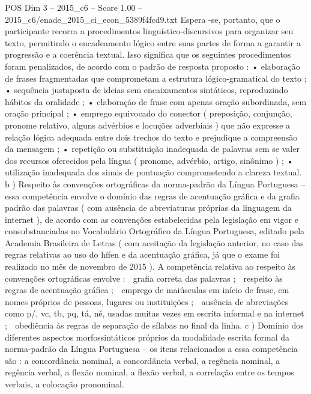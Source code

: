 \begin{textsample}{POS Dim 3 – 2015\_c6 – Score 1.00 – 2015\_c6/enade\_2015\_ci\_econ\_5389f4fcd9.txt}
Espera -se, portanto, que o participante recorra a procedimentos linguístico-discursivos para organizar seu texto, permitindo o encadeamento lógico entre suas partes de forma a garantir a progressão e a coerência textual.
Isso significa que os seguintes procedimentos foram penalizados, de acordo com o padrão de resposta proposto : • elaboração de frases fragmentadas que comprometam a estrutura lógico-gramatical do texto ; • sequência justaposta de ideias sem encaixamentos sintáticos, reproduzindo hábitos da oralidade ; • elaboração de frase com apenas oração subordinada, sem oração principal ; • emprego equivocado do conector ( preposição, conjunção, pronome relativo, alguns advérbios e locuções adverbiais ) que não expresse a relação lógica adequada entre dois trechos do texto e prejudique a compreensão da mensagem ; • repetição ou substituição inadequada de palavras sem se valer dos recursos oferecidos pela língua ( pronome, advérbio, artigo, sinônimo ) ; • utilização inadequada dos sinais de pontuação comprometendo a clareza textual. b ) Respeito às convenções ortográficas da norma-padrão da Língua Portuguesa – essa competência envolve o domínio das regras de acentuação gráfica e da grafia padrão das palavras ( com ausência de abreviaturas próprias da linguagem da internet ), de acordo com as convenções estabelecidas pela legislação em vigor e consubstanciadas no Vocabulário Ortográfico da Língua Portuguesa, editado pela Academia Brasileira de Letras ( com aceitação da legislação anterior, no caso das regras relativas ao uso do hífen e da acentuação gráfica, já que o exame foi realizado no mês de novembro de 2015 ).
A competência relativa ao respeito às convenções ortográficas envolve :  grafia correta das palavras ;  respeito às regras de acentuação gráfica ;  emprego de maiúsculas em início de frase, em nomes próprios de pessoas, lugares ou instituições ;  ausência de abreviações como p/, vc, tb, pq, tá, né, usadas muitas vezes em escrita informal e na internet ;  obediência às regras de separação de sílabas no final da linha. c ) Domínio dos diferentes aspectos morfossintáticos próprios da modalidade escrita formal da norma-padrão da Língua Portuguesa – os itens relacionados a essa competência são : a concordância nominal, a concordância verbal, a regência nominal, a regência verbal, a flexão nominal, a flexão verbal, a correlação entre os tempos verbais, a colocação pronominal.

\end{textsample}
